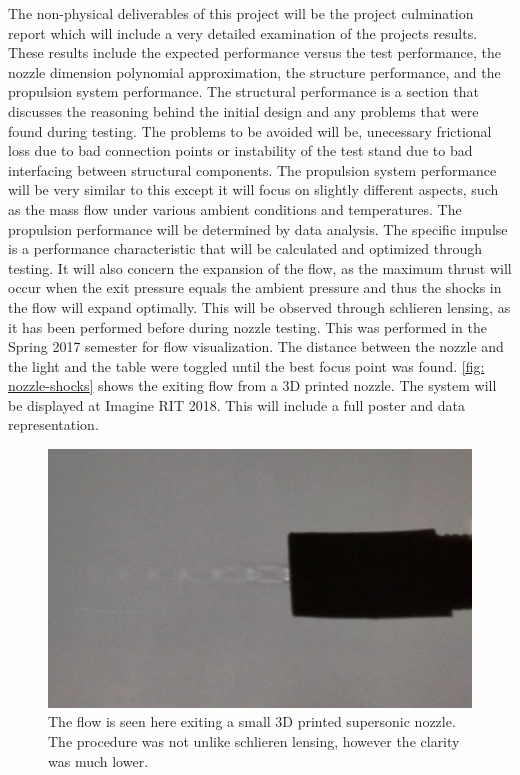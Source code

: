 \documentclass[conference]{IEEEtran} %
\begin{document}
The non-physical deliverables of this project will be the project culmination report which will include a very detailed examination of the projects
results. These results include the expected performance versus the test performance, the nozzle dimension polynomial approximation, the structure performance, and the
propulsion system performance. The structural performance is a section that discusses the reasoning behind the initial design and any problems
that were found during testing. The problems to be avoided will be, unecessary frictional loss due to bad connection points or instability of the test stand due to
bad interfacing between structural components. The propulsion system performance will be very similar to this except it will focus on slightly different aspects, such as
the mass flow under various ambient conditions and temperatures. The propulsion performance will be determined by data analysis. The specific impulse is a performance
characteristic that will be calculated and optimized through testing. It will also concern the expansion of the flow, as the maximum thrust will occur when the exit pressure equals the ambient pressure and thus the shocks
in the flow will expand optimally. This will be observed through schlieren lensing, as it has been performed before during nozzle testing. This was performed in the Spring 2017
semester for flow visualization. The distance between the nozzle and the light and the table were toggled until the best focus point was found. \autoref{fig: nozzle-shocks}
shows the exiting flow from a 3D printed nozzle. The system will be displayed at Imagine RIT 2018. This will include a full poster and data representation.

\begin{figure}[ht]
  \includegraphics[width=\linewidth]{figs/nozzle-shocks[2].png}
  \caption{The flow is seen here exiting a small 3D printed supersonic nozzle. The procedure was not unlike schlieren lensing, however the clarity was much lower.}
\label{fig: nozzle-shocks}
\end{figure}
\end{document}
